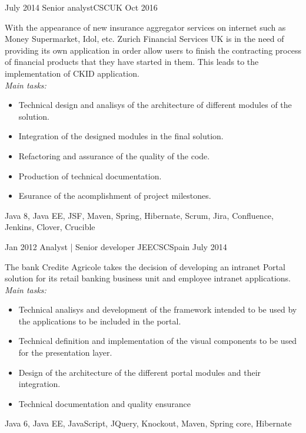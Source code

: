 \begin{experiences}
  \emptySeparator   
  
    \experience
    {July 2014} {Senior analyst}{CSC}{UK}
    {Oct 2016}    {

With the appearance of new insurance aggregator services on internet such as Money
Supermarket, Idol, etc. Zurich Financial Services UK is in the need of providing its own
application in order allow users to finish the contracting process of financial products that they
have started in them. This leads to the implementation of CKID
application.
\\
\emph{Main tasks:}
    	
                      \begin{itemize}
                        \item Technical design and analisys of the architecture of different modules of the solution.
                        \item Integration of the designed modules in the final solution.                
                        \item Refactoring and assurance of the quality of the code.
                        \item Production of technical documentation.
                        \item Esurance of the acomplishment of project milestones.
                      \end{itemize}
                    }
                    {Java 8, Java EE, JSF, Maven, Spring, Hibernate, Scrum, Jira, Confluence, Jenkins, Clover, Crucible}
                    
  \emptySeparator
  
    \experience
    {Jan 2012} {Analyst | Senior developer JEE}{CSC}{Spain}
    {July 2014}    {

The bank Credite Agricole takes the decision of developing an intranet Portal solution for its
retail banking business unit and employee intranet applications.
\\
\emph{Main tasks:}    	
                      \begin{itemize}
                        \item Technical analisys and development of the framework intended to be used by the applications to be included in the portal.
                        \item Technical definition and implementation of the visual components to be used for the presentation layer.                   
                        \item Design of the architecture of the different portal modules and their integration.
                        \item Technical documentation and quality ensurance
                      \end{itemize}
                    }
                    {Java 6, Java EE, JavaScript, JQuery, Knockout, Maven, Spring core, Hibernate}
                    

\end{experiences}
